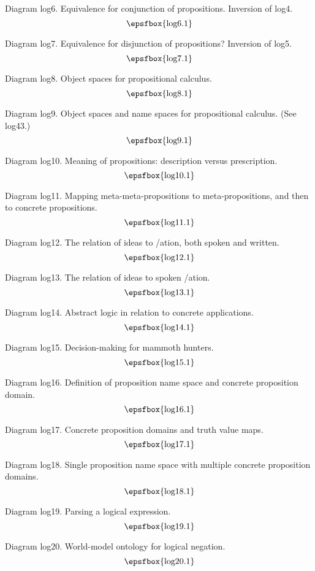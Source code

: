 Diagram log6. Equivalence for conjunction of propositions. Inversion of
log4.
$$
\centerline{\epsfbox{log6.1}}
$$

Diagram log7. Equivalence for disjunction of propositions? Inversion of
log5.
$$
\centerline{\epsfbox{log7.1}}
$$

Diagram log8. Object spaces for propositional calculus.
$$
\centerline{\epsfbox{log8.1}}
$$

Diagram log9. Object spaces and name spaces for propositional calculus. (See
log43.)
$$
\centerline{\epsfbox{log9.1}}
$$

\filleject

Diagram log10. Meaning of propositions: description versus prescription.
$$
\centerline{\epsfbox{log10.1}}
$$

Diagram log11. Mapping meta-meta-propositions to meta-propositions, and then to
concrete propositions.
$$
\centerline{\epsfbox{log11.1}}
$$

Diagram log12. The relation of ideas to \verbalis/ation, both spoken and
written.
$$
\centerline{\epsfbox{log12.1}}
$$

Diagram log13. The relation of ideas to spoken \verbalis/ation.
$$
\centerline{\epsfbox{log13.1}}
$$

Diagram log14. Abstract logic in relation to concrete applications.
$$
\centerline{\epsfbox{log14.1}}
$$

\filleject

Diagram log15. Decision-making for mammoth hunters.
$$
\centerline{\epsfbox{log15.1}}
$$

Diagram log16. Definition of proposition name space and concrete proposition
domain.
$$
\centerline{\epsfbox{log16.1}}
$$

Diagram log17. Concrete proposition domains and truth value maps.
$$
\centerline{\epsfbox{log17.1}}
$$

\filleject

Diagram log18. Single proposition name space with multiple concrete proposition
domains.
$$
\centerline{\epsfbox{log18.1}}
$$

Diagram log19. Parsing a logical expression.
$$
\centerline{\epsfbox{log19.1}}
$$

Diagram log20. World-model ontology for logical negation.
$$
\centerline{\epsfbox{log20.1}}
$$

